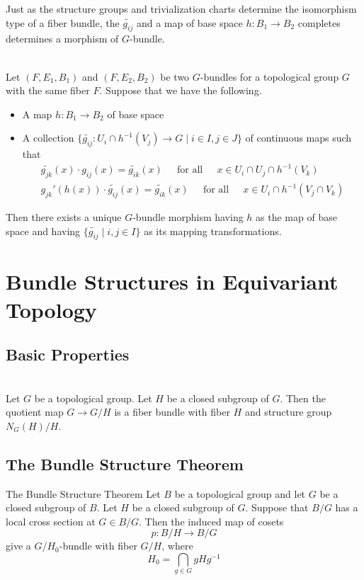 \documentclass[a4paper]{article}
\begin{document}
Just as the structure groups and trivialization charts determine the isomorphism type of a fiber bundle, the $\widetilde{g_{ij}}$ and a map of base space $h:B_1\to B_2$ completes determines a morphism of $G$-bundle. 

\begin{thm}{}{}\\
Let $(F,E_1,B_1)$ and $(F,E_2,B_2)$ be two $G$-bundles for a topological group $G$ with the same fiber $F$. Suppose that we have the following. 
\begin{itemize}
\item A map $h:B_1\to B_2$ of base space
\item A collection $\{\widetilde{g_{ij}}:U_i\cap h^{-1}(V_j)\to G\;|\;i\in I,j\in J\}$ of continuous maps such that \begin{gather*}
\widetilde{g_{jk}}(x)\cdot g_{ij}(x)=\widetilde{g_{ik}}(x)\;\;\;\;\text{ for all }\;\;\;\;x\in U_i\cap U_j\cap h^{-1}(V_k)\\
g_{jk}'(h(x))\cdot\widetilde{g_{ij}}(x)=\widetilde{g_{ik}}(x)\;\;\;\;\text{ for all }\;\;\;\;x\in U_i\cap h^{-1}(V_j\cap V_k)
\end{gather*}
\end{itemize}
Then there exists a unique $G$-bundle morphism having $h$ as the map of base space and having $\{\widetilde{g_{ij}}\;|\;i,j\in I\}$ as its mapping transformations. 
\end{thm}

\pagebreak
\section{Bundle Structures in Equivariant Topology}
\subsection{Basic Properties}
\begin{prp}{}{}\\
Let $G$ be a topological group. Let $H$ be a closed subgroup of $G$. Then the quotient map $G\to G/H$ is a fiber bundle with fiber $H$ and structure group $N_G(H)/H$. 
\end{prp}

\subsection{The Bundle Structure Theorem}
\begin{thm}{The Bundle Structure Theorem}{} Let $B$ be a topological group and let $G$ be a closed subgroup of $B$. Let $H$ be a closed subgroup of $G$. Suppose that $B/G$ has a local cross section at $G\in B/G$. Then the induced map of cosets $$p:B/H\to B/G$$ give a $G/H_0$-bundle with fiber $G/H$, where $$H_0=\bigcap_{g\in G}gHg^{-1}$$
\end{thm}
\end{document}
